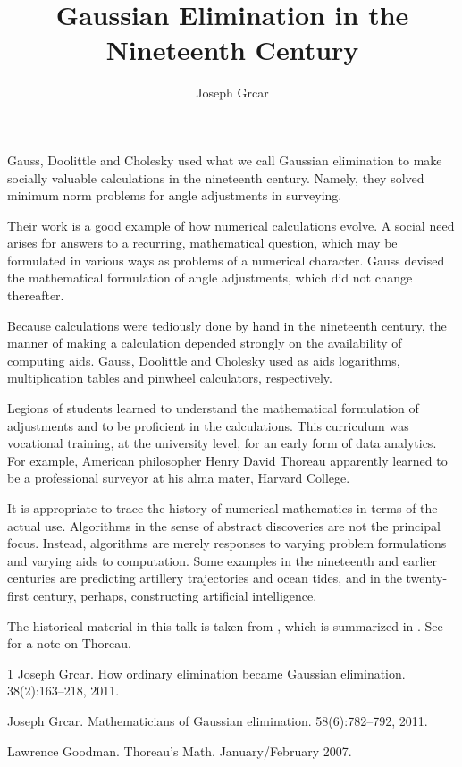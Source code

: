 \documentclass[a4paper]{amsart}
\date{}
\begin{document}
\title{Gaussian Elimination in the Nineteenth Century}
\author{Joseph Grcar} %
\address{Castro Valley, California} %

\maketitle


Gauss, Doolittle and Cholesky used what we call Gaussian elimination to make socially valuable calculations in the nineteenth century.
Namely, they solved minimum norm problems for angle adjustments in surveying.

Their work is a good example of how numerical calculations evolve.
A social need arises for answers to a recurring, mathematical question, which may be formulated in various ways as  problems of a numerical character.
Gauss devised the mathematical formulation of angle adjustments, which did not change thereafter.

Because calculations were tediously done by hand in the nineteenth century, the manner of making a calculation depended strongly on the availability of computing aids. 
Gauss, Doolittle and Cholesky used as aids logarithms, multiplication tables and pinwheel calculators, respectively.

Legions of students learned to understand the mathematical formulation of adjustments and to be proficient in the calculations.
This curriculum was vocational training, at the university level, for an early form of data analytics.
For example, American philosopher Henry David Thoreau apparently learned to be a professional surveyor at his alma mater, Harvard College.

It is appropriate to trace the history of numerical mathematics in terms of the actual use.
Algorithms in the sense of abstract discoveries are not the principal focus.
Instead, algorithms are merely responses to varying problem formulations and varying aids to computation.
Some examples in the nineteenth and earlier centuries are predicting artillery trajectories and ocean tides, and in the twenty-first century, perhaps, constructing artificial intelligence.

The historical material in this talk is taken from \cite {Grcar-HM}, which is summarized in \cite {Grcar-Notices}.
See \cite {Goodman-BAM} for a note on Thoreau.

\begin{thebibliography}{1}
Joseph Grcar.
\newblock How ordinary elimination became Gaussian elimination.
  38(2):163--218, 2011.

Joseph Grcar.
\newblock Mathematicians of Gaussian elimination.
 58(6):782--792, 2011.

Lawrence Goodman.
\newblock Thoreau's Math.
 January/February 2007.
\end{thebibliography}
\end{document}
